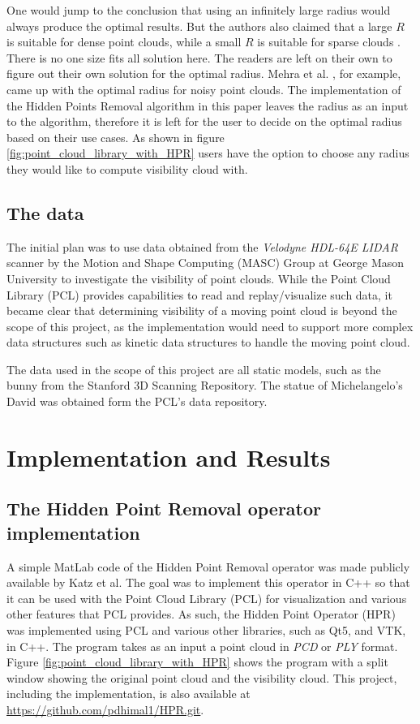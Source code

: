 \documentclass[11pt]{article}
\begin{document}
One would jump to the conclusion that using an infinitely large radius would always produce the optimal results. But the authors also claimed that a large $R$ is suitable for dense point clouds, while a small $R$ is suitable for sparse clouds \cite{Katz07}. There is no one size fits all solution here. The readers are left on their own to figure out their own solution for the optimal radius. Mehra et al. \cite{Mehra10}, for example, came up with the optimal radius for noisy point clouds. The implementation of the Hidden Points Removal algorithm in this paper leaves the radius as an input to the algorithm, therefore it is left for the user to decide on the optimal radius based on their use cases. As shown in figure \ref{fig:point_cloud_library_with_HPR} users have the option to choose any radius they would like to compute visibility cloud with. 

\subsection{The data}
The initial plan was to use data obtained from the \textit{Velodyne HDL-64E LIDAR} scanner by the Motion and Shape Computing (MASC) Group at George Mason University to investigate the visibility of point clouds. While the Point Cloud Library (PCL) \cite{pcl} provides capabilities to read and replay/visualize such data, it became clear that determining visibility of a moving point cloud is beyond the scope of this project, as the implementation would need to support more complex data structures such as kinetic data structures to handle the moving point cloud. 

The data used in the scope of this project are all static models, such as the bunny from the Stanford 3D Scanning Repository. The statue of Michelangelo's David was obtained form the PCL's data repository. 

\section{Implementation and Results}

\subsection{The Hidden Point Removal operator implementation}
A simple MatLab code of the Hidden Point Removal operator was made publicly available by Katz et al. The goal was to implement this operator in C++ so that it can be used with the Point Cloud Library (PCL) for visualization and various other features that PCL provides. As such, the Hidden Point Operator (HPR) was implemented using PCL and various other libraries, such as Qt5, and VTK, in C++. The program  takes as an input a point cloud in \textit{PCD} or \textit{PLY} format. Figure \ref{fig:point_cloud_library_with_HPR} shows the program with a split window showing the original point cloud and the visibility cloud. This project, including the implementation, is also available at \href{https://github.com/pdhimal1/HPR.git}{https://github.com/pdhimal1/HPR.git}.
\end{document}
